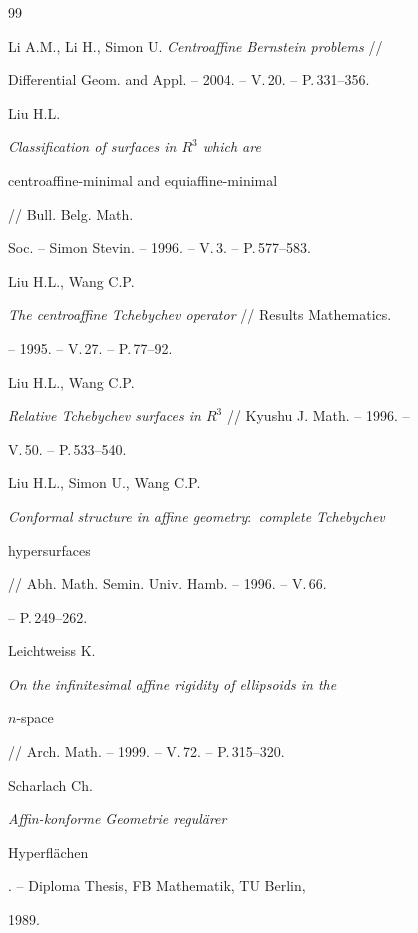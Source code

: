 \begin{thebibliography}{99}

Li A.M., Li H., Simon U. {\it Centroaffine Bernstein problems} //

Differential Geom. and Appl. -- 2004. -- V.\,20. -- P.\,331--356.




Liu H.L. {\it Classification of surfaces in $R^3$ which are

centroaffine-minimal and equiaffine-minimal} // Bull. Belg. Math.

Soc. -- Simon Stevin. -- 1996. -- V.\,3. -- P.\,577--583.




Liu H.L., Wang C.P.

{\it The centroaffine Tchebychev operator} // Results Mathematics.

-- 1995. -- V.\,27. -- P.\,77--92.




Liu H.L., Wang C.P.

{\it Relative Tchebychev surfaces in $R^3$} // Kyushu J. Math. -- 1996. --

V.\,50. -- P.\,533--540.




Liu H.L., Simon U., Wang C.P.

{\it Conformal structure in affine geometry$:$ complete Tchebychev

hypersurfaces} // Abh. Math. Semin. Univ. Hamb. -- 1996. -- V.\,66.

-- P.\,249--262.




Leichtweiss K.

{\it On the infinitesimal affine rigidity of ellipsoids in the

$n$-space} // Arch. Math. -- 1999. -- V.\,72. -- P.\,315--320.




Scharlach Ch. {\it Affin-konforme Geometrie regul{\"a}rer

Hyperfl{\"a}chen}. -- Diploma Thesis, FB Mathematik, TU Berlin,

1989.





\end{thebibliography}
